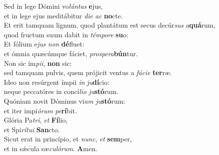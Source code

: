 \evenverse Sed in lege Dómini vo\textit{lún}\textit{tas} \textbf{e}jus,~\*\\
\evenverse et in lege ejus meditábitur \textit{di}\textit{e} \textit{ac} \textbf{no}cte.\\
\oddverse Et erit tamquam lignum, quod plantátum est secus decúr\textit{sus} \textit{a}\textbf{quá}rum,~\*\\
\oddverse quod fructum suum dabit in \textit{tém}\textit{po}\textit{re} \textbf{su}o:\\
\evenverse Et fólium e\textit{jus} \textit{non} \textbf{dé}fluet:~\*\\
\evenverse et ómnia quæcúmque fáciet, \textit{pro}\textit{spe}\textit{ra}\textbf{bún}tur.\\
\oddverse Non sic ím\textit{pi}\textit{i}, \textbf{non} sic:~\*\\
\oddverse sed tamquam pulvis, quem prójicit ventus a \textit{fá}\textit{ci}\textit{e} \textbf{ter}ræ.\\
\evenverse Ideo non resúrgent ímpii \textit{in} \textit{ju}\textbf{dí}cio:~\*\\
\evenverse neque peccatóres in concí\textit{li}\textit{o} \textit{ju}\textbf{stó}rum.\\
\oddverse Quóniam novit Dóminus vi\textit{am} \textit{ju}\textbf{stó}rum:~\*\\
\oddverse et iter impi\textit{ó}\textit{rum} \textit{pe}\textbf{rí}bit.\\
\evenverse Glória Pa\textit{tri}, \textit{et} \textbf{Fí}lio,~\*\\
\evenverse et Spi\textit{rí}\textit{tu}\textit{i} \textbf{San}cto.\\
\oddverse Sicut erat in princípio, et \textit{nunc}, \textit{et} \textbf{sem}per,~\*\\
\oddverse et in sǽcula sæ\textit{cu}\textit{ló}\textit{rum}. \textbf{A}men.\\
